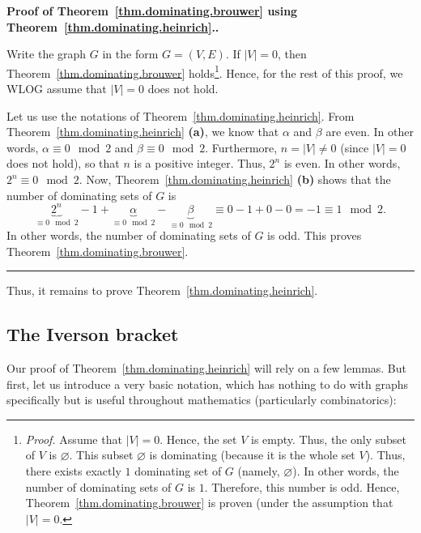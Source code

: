\documentclass[numbers=enddot,12pt,final,onecolumn,notitlepage]{scrartcl}%
\theoremstyle{definition}
\newenvironment{proof}[1][Proof]{\noindent\textbf{#1.} }{\ \rule{0.5em}{0.5em}}
\newcommand{\abs}[1]{\left| #1 \right|}
\newcommand{\tup}[1]{\left( #1 \right)}
\begin{document}
\begin{proof}[Proof of Theorem~\ref{thm.dominating.brouwer} using
Theorem~\ref{thm.dominating.heinrich}.]

Write the graph $G$ in the form $G = \tup{V, E}$. If $\abs{V} = 0$,
then Theorem~\ref{thm.dominating.brouwer}
holds\footnote{\textit{Proof.} Assume that $\abs{V} = 0$. Hence,
the set $V$ is empty. Thus, the only subset of $V$ is $\varnothing$.
This subset $\varnothing$ is dominating (because it is the whole
set $V$). Thus, there exists exactly $1$ dominating set of $G$
(namely, $\varnothing$). In other words, the number of dominating
sets of $G$ is $1$. Therefore, this number is odd. Hence,
Theorem~\ref{thm.dominating.brouwer} is proven (under the assumption
that $\abs{V} = 0$.}. Hence, for the rest of this proof, we
WLOG assume that $\abs{V} = 0$ does not hold.

Let us use the notations of Theorem~\ref{thm.dominating.heinrich}.
From Theorem~\ref{thm.dominating.heinrich} \textbf{(a)}, we know
that $\alpha$ and $\beta$ are even. In other words,
$\alpha \equiv 0 \mod 2$ and $\beta \equiv 0 \mod 2$.
Furthermore, $n = \abs{V} \neq 0$ (since $\abs{V} = 0$ does not
hold), so that $n$ is a positive integer. Thus, $2^n$ is even.
In other words, $2^n \equiv 0 \mod 2$. Now,
Theorem~\ref{thm.dominating.heinrich} \textbf{(b)} shows that
the number of dominating sets of $G$ is
\[
\underbrace{2^n}_{\equiv 0 \mod 2} - 1
  + \underbrace{\alpha}_{\equiv 0 \mod 2}
  - \underbrace{\beta}_{\equiv 0 \mod 2}
\equiv 0 - 1 + 0 - 0 = -1 \equiv 1 \mod 2.
\]
In other words, the number of dominating sets of $G$ is odd.
This proves Theorem~\ref{thm.dominating.brouwer}.
\end{proof}

Thus, it remains to prove Theorem~\ref{thm.dominating.heinrich}.

\subsection{\label{subsect.dominating.iverson}The Iverson bracket}

Our proof of Theorem~\ref{thm.dominating.heinrich} will rely on
a few lemmas. But first, let us introduce a very basic notation, which
has nothing to do with graphs specifically but is useful
throughout mathematics (particularly combinatorics):
\end{document}
